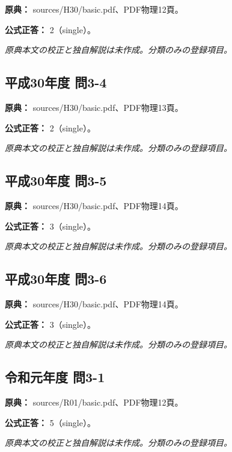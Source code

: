 \noindent\textbf{原典：} sources/H30/basic.pdf、PDF物理12頁。

\textbf{公式正答：} 2（single）。

\par\textit{原典本文の校正と独自解説は未作成。分類のみの登録項目。}

\subsection{平成30年度 問3-4}
\label{q:h30-reg-basic-3-4}

\noindent\textbf{原典：} sources/H30/basic.pdf、PDF物理13頁。

\textbf{公式正答：} 2（single）。

\par\textit{原典本文の校正と独自解説は未作成。分類のみの登録項目。}

\subsection{平成30年度 問3-5}
\label{q:h30-reg-basic-3-5}

\noindent\textbf{原典：} sources/H30/basic.pdf、PDF物理14頁。

\textbf{公式正答：} 3（single）。

\par\textit{原典本文の校正と独自解説は未作成。分類のみの登録項目。}

\subsection{平成30年度 問3-6}
\label{q:h30-reg-basic-3-6}

\noindent\textbf{原典：} sources/H30/basic.pdf、PDF物理14頁。

\textbf{公式正答：} 3（single）。

\par\textit{原典本文の校正と独自解説は未作成。分類のみの登録項目。}

\subsection{令和元年度 問3-1}
\label{q:r01-reg-basic-3-1}

\noindent\textbf{原典：} sources/R01/basic.pdf、PDF物理12頁。

\textbf{公式正答：} 5（single）。

\par\textit{原典本文の校正と独自解説は未作成。分類のみの登録項目。}


